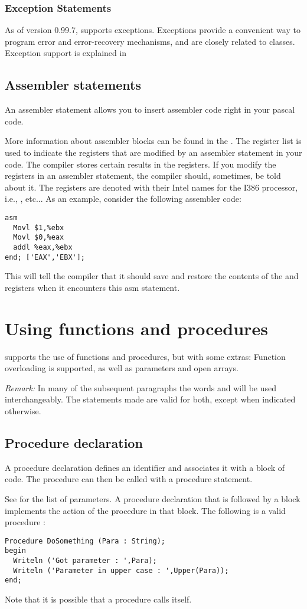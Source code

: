 \documentclass{report}
\begin{document}
\subsection{Exception Statements}
As of version 0.99.7, \fpc supports exceptions. Exceptions provide a
convenient way to program error and error-recovery mechanisms, and are
closely related to classes.
Exception support is explained in 

\section{Assembler statements}
An assembler statement allows you to insert assembler code right in your
pascal code.

More information about assembler blocks can be found in the \progref.
The register list is used to indicate the registers that are modified by an
assembler statement in your code. The compiler stores certain results in the
registers. If you modify the registers in an assembler statement, the compiler
should, sometimes, be told about it. The registers are denoted with their
Intel names for the I386 processor, i.e., ,  etc...
As an example, consider the following assembler code:
\begin{verbatim}
asm
  Movl $1,%ebx
  Movl $0,%eax
  addl %eax,%ebx
end; ['EAX','EBX'];
\end{verbatim}
This will tell the compiler that it should save and restore the contents of
the  and  registers when it encounters this asm statement.
\chapter{Using functions and procedures}
\label{ch:Procedures}
\fpc supports the use of functions and procedures, but with some extras:
Function overloading is supported, as well as  parameters and
open arrays.

{\em Remark:} In many of the subsequent paragraphs the words 
and  will be used interchangeably. The statements made are
valid for both, except when indicated otherwise.

\section{Procedure declaration}
A procedure declaration defines an identifier and associates it with a
block of code. The procedure can then be called with a procedure statement.

See  for the list of parameters.
A procedure declaration that is followed by a block implements the action of
the procedure in that block.
The following is a valid procedure :
\begin{verbatim}
Procedure DoSomething (Para : String);
begin
  Writeln ('Got parameter : ',Para);
  Writeln ('Parameter in upper case : ',Upper(Para));
end;
\end{verbatim}
Note that it is possible that a procedure calls itself.
\end{document}
